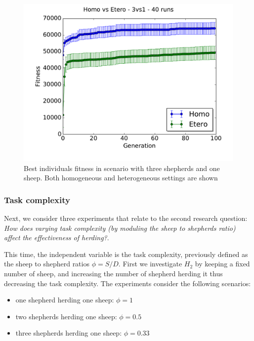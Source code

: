 \documentclass[conference]{IEEEtran}
\begin{document}
\begin{figure}[ht]
	\centering
	\includegraphics[width=1\hsize]{imgs/homo3v1-hetero3v1-bestSoFar.pdf}
	\caption{Best individuals fitness in scenario with three shepherds and one sheep. Both homogeneous and heterogeneous settings are shown}
	\label{fig:3v1_homo_vs_hetero}
\end{figure}


\vspace{0.5em}
\subsubsection{Task complexity}
Next, we consider three experiments that relate to the second research question: \textit{How does varying task complexity (by moduling the sheep to shepherds ratio) affect the effectiveness of herding?}. 

This time, the independent variable is the task complexity, previously defined as the sheep to shepherd ratios $\phi = S / D$. First we investigate $H_2$ by keeping a fixed number of sheep, and increasing the number of shepherd herding it thus decreasing the task complexity. The experiments consider the following scenarios:
\begin{itemize}
	\item one shepherd herding one sheep: $\phi = 1$
	\item two shepherds herding one sheep: $\phi = 0.5$
	\item three shepherds herding one sheep: $\phi = 0.33$
\end{itemize}	
\end{document}
